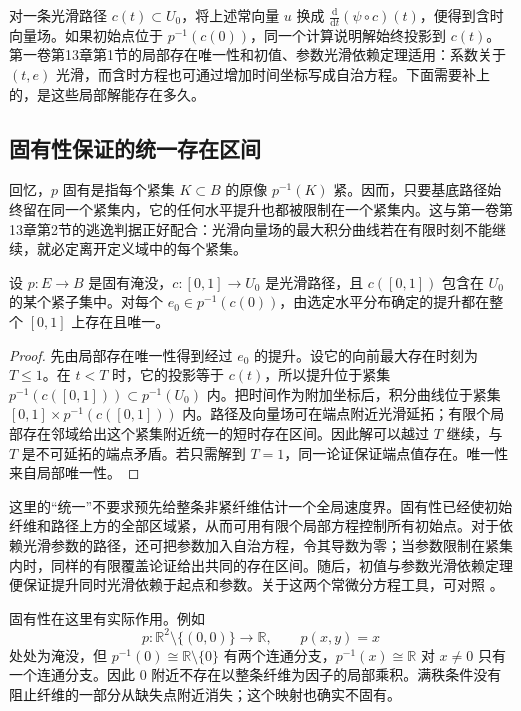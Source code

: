 对一条光滑路径 \(c(t)\subset U_0\)，将上述常向量 \(u\) 换成 \(\frac{\mathrm{d}}{\mathrm{d}t}(\psi\circ c)(t)\)，便得到含时向量场。如果初始点位于 \(p^{-1}(c(0))\)，同一个计算说明解始终投影到 \(c(t)\)。第一卷第13章第1节的局部存在唯一性和初值、参数光滑依赖定理适用：系数关于 \((t,e)\) 光滑，而含时方程也可通过增加时间坐标写成自治方程。下面需要补上的，是这些局部解能存在多久。

\subsection{固有性保证的统一存在区间}
\label{g2:subsec:1506:02}

回忆，\(p\) 固有是指每个紧集 \(K\subset B\) 的原像 \(p^{-1}(K)\) 紧。因而，只要基底路径始终留在同一个紧集内，它的任何水平提升也都被限制在一个紧集内。这与第一卷第13章第2节的逃逸判据正好配合：光滑向量场的最大积分曲线若在有限时刻不能继续，就必定离开定义域中的每个紧集。

\begin{lemma}\label{g2:lem:proper-horizontal-lift}
	设 \(p:E\to B\) 是固有淹没，\(c:[0,1]\to U_0\) 是光滑路径，且 \(c([0,1])\) 包含在 \(U_0\) 的某个紧子集中。对每个 \(e_0\in p^{-1}(c(0))\)，由选定水平分布确定的提升都在整个 \([0,1]\) 上存在且唯一。
\end{lemma}
\begin{proof}
	先由局部存在唯一性得到经过 \(e_0\) 的提升。设它的向前最大存在时刻为 \(T\leq1\)。在 \(t<T\) 时，它的投影等于 \(c(t)\)，所以提升位于紧集 \(p^{-1}(c([0,1]))\subset p^{-1}(U_0)\) 内。把时间作为附加坐标后，积分曲线位于紧集 \([0,1]\times p^{-1}(c([0,1]))\) 内。路径及向量场可在端点附近光滑延拓；有限个局部存在邻域给出这个紧集附近统一的短时存在区间。因此解可以越过 \(T\) 继续，与 \(T\) 是不可延拓的端点矛盾。若只需解到 \(T=1\)，同一论证保证端点值存在。唯一性来自局部唯一性。
\end{proof}

这里的“统一”不要求预先给整条非紧纤维估计一个全局速度界。固有性已经使初始纤维和路径上方的全部区域紧，从而可用有限个局部方程控制所有初始点。对于依赖光滑参数的路径，还可把参数加入自治方程，令其导数为零；当参数限制在紧集内时，同样的有限覆盖论证给出共同的存在区间。随后，初值与参数光滑依赖定理便保证提升同时光滑依赖于起点和参数。关于这两个常微分方程工具，可对照 \cite[第9章，第215--217页]{Lee2012Smooth}。

\ProseParagraphBreak

固有性在这里有实际作用。例如
\[
	p:\mathbb R^2\setminus\{(0,0)\}\longrightarrow\mathbb R,
	\qquad p(x,y)=x
\]
处处为淹没，但 \(p^{-1}(0)\cong\mathbb R\setminus\{0\}\) 有两个连通分支，\(p^{-1}(x)\cong\mathbb R\) 对 \(x\ne0\) 只有一个连通分支。因此 \(0\) 附近不存在以整条纤维为因子的局部乘积。满秩条件没有阻止纤维的一部分从缺失点附近消失；这个映射也确实不固有。

